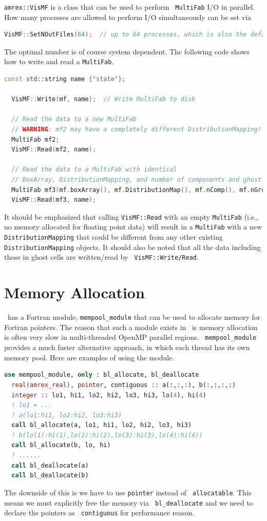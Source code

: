 {{{\tt amrex::VisMF} is a class that can be used to perform {\tt
  MultiFab} I/O in parallel.  How many processes are allowed to
perform I/O simultaneously can be set via
\begin{lstlisting}[language=cpp]
  VisMF::SetNOutFiles(64);  // up to 64 processes, which is also the default.
\end{lstlisting}
The optimal number is of course system dependent.  The following code
shows how to write and read a {\tt MultiFab}.
\begin{lstlisting}[language=cpp]
  const std::string name {"state"};

  VisMF::Write(mf, name);  // Write MultiFab to disk

  // Read the data to a new MultiFab
  // WARNING: mf2 may have a completely different DistributionMapping!
  MultiFab mf2;
  VisMF::Read(mf2, name);

  // Read the data to a MultiFab with identical
  // BoxArray, DistributionMapping, and number of components and ghost cells.
  MultiFab mf3(mf.boxArray(), mf.DistributionMap(), mf.nComp(), mf.nGrow());
  VisMF::Read(mf3, name);
\end{lstlisting}
It should be emphasized that calling {\tt VisMF::Read} with an empty
{\tt MultiFab} (i.e., no memory allocated for floating point data)
will result in a {\tt MultiFab} with a new {\tt DistributionMapping}
that could be different from any other existing {\tt
DistributionMapping} objects.  It should also be noted that all the
data including those in ghost cells are written/read by {\tt
VisMF::Write/Read}. 

\section{Memory Allocation}

\amrex\ has a Fortran module, {\tt mempool\_module} that can be used to
allocate memory for Fortran pointers.  The reason that such a module
exists in \amrex\ is memory allocation is often very slow in
multi-threaded OpenMP parallel regions.  \amrex\ {\tt mempool\_module}
provides a much faster alternative approach, in which each thread has
its own memory pool.  Here are examples of using the module.
\begin{lstlisting}[language=fortran]
  use mempool_module, only : bl_allocate, bl_deallocate
  real(amrex_real), pointer, contiguous :: a(:,:,:), b(:,:,:,:)
  integer :: lo1, hi1, lo2, hi2, lo3, hi3, lo(4), hi(4)
  ! lo1 = ...
  ! a(lo1:hi1, lo2:hi2, lo3:hi3)
  call bl_allocate(a, lo1, hi1, lo2, hi2, lo3, hi3)
  ! b(lo(1):hi(1),lo(2):hi(2),lo(3):hi(3),lo(4):hi(4))
  call bl_allocate(b, lo, hi)
  ! ......
  call bl_deallocate(a)
  call bl_deallocate(b)
\end{lstlisting}
The downside of this is we have to use {\tt pointer} instead of {\tt
allocatable}.  This means we must explicitly free the memory via {\tt
bl\_deallocate} and we need to declare the pointers as {\tt
contiguous} for performance reason.

}}
